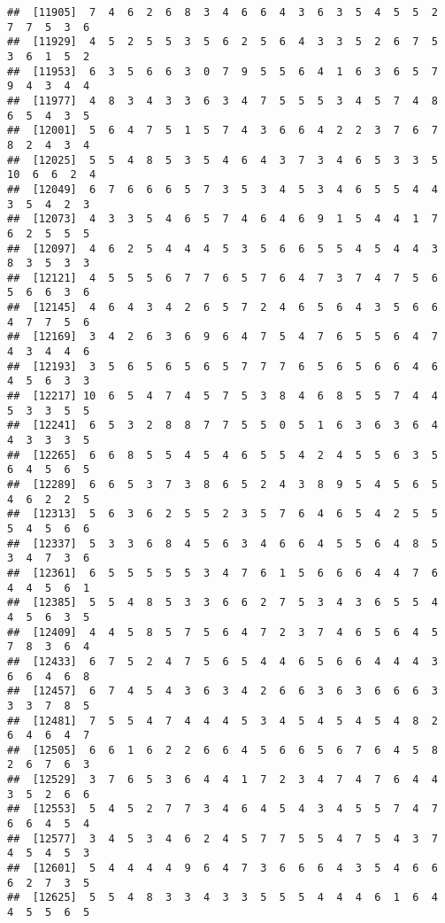 \documentclass[
]{book}
\begin{document}
\begin{verbatim}
##  [11905]  7  4  6  2  6  8  3  4  6  6  4  3  6  3  5  4  5  5  2  7  7  5  3  6
##  [11929]  4  5  2  5  5  3  5  6  2  5  6  4  3  3  5  2  6  7  5  3  6  1  5  2
##  [11953]  6  3  5  6  6  3  0  7  9  5  5  6  4  1  6  3  6  5  7  9  4  3  4  4
##  [11977]  4  8  3  4  3  3  6  3  4  7  5  5  5  3  4  5  7  4  8  6  5  4  3  5
##  [12001]  5  6  4  7  5  1  5  7  4  3  6  6  4  2  2  3  7  6  7  8  2  4  3  4
##  [12025]  5  5  4  8  5  3  5  4  6  4  3  7  3  4  6  5  3  3  5 10  6  6  2  4
##  [12049]  6  7  6  6  6  5  7  3  5  3  4  5  3  4  6  5  5  4  4  3  5  4  2  3
##  [12073]  4  3  3  5  4  6  5  7  4  6  4  6  9  1  5  4  4  1  7  6  2  5  5  5
##  [12097]  4  6  2  5  4  4  4  5  3  5  6  6  5  5  4  5  4  4  3  8  3  5  3  3
##  [12121]  4  5  5  5  6  7  7  6  5  7  6  4  7  3  7  4  7  5  6  5  6  6  3  6
##  [12145]  4  6  4  3  4  2  6  5  7  2  4  6  5  6  4  3  5  6  6  4  7  7  5  6
##  [12169]  3  4  2  6  3  6  9  6  4  7  5  4  7  6  5  5  6  4  7  4  3  4  4  6
##  [12193]  3  5  6  5  6  5  6  5  7  7  7  6  5  6  5  6  6  4  6  4  5  6  3  3
##  [12217] 10  6  5  4  7  4  5  7  5  3  8  4  6  8  5  5  7  4  4  5  3  3  5  5
##  [12241]  6  5  3  2  8  8  7  7  5  5  0  5  1  6  3  6  3  6  4  4  3  3  3  5
##  [12265]  6  6  8  5  5  4  5  4  6  5  5  4  2  4  5  5  6  3  5  6  4  5  6  5
##  [12289]  6  6  5  3  7  3  8  6  5  2  4  3  8  9  5  4  5  6  5  4  6  2  2  5
##  [12313]  5  6  3  6  2  5  5  2  3  5  7  6  4  6  5  4  2  5  5  5  4  5  6  6
##  [12337]  5  3  3  6  8  4  5  6  3  4  6  6  4  5  5  6  4  8  5  3  4  7  3  6
##  [12361]  6  5  5  5  5  5  3  4  7  6  1  5  6  6  6  4  4  7  6  4  4  5  6  1
##  [12385]  5  5  4  8  5  3  3  6  6  2  7  5  3  4  3  6  5  5  4  4  5  6  3  5
##  [12409]  4  4  5  8  5  7  5  6  4  7  2  3  7  4  6  5  6  4  5  7  8  3  6  4
##  [12433]  6  7  5  2  4  7  5  6  5  4  4  6  5  6  6  4  4  4  3  6  6  4  6  8
##  [12457]  6  7  4  5  4  3  6  3  4  2  6  6  3  6  3  6  6  6  3  3  3  7  8  5
##  [12481]  7  5  5  4  7  4  4  4  5  3  4  5  4  5  4  5  4  8  2  6  4  6  4  7
##  [12505]  6  6  1  6  2  2  6  6  4  5  6  6  5  6  7  6  4  5  8  2  6  7  6  3
##  [12529]  3  7  6  5  3  6  4  4  1  7  2  3  4  7  4  7  6  4  4  3  5  2  6  6
##  [12553]  5  4  5  2  7  7  3  4  6  4  5  4  3  4  5  5  7  4  7  6  6  4  5  4
##  [12577]  3  4  5  3  4  6  2  4  5  7  7  5  5  4  7  5  4  3  7  4  5  4  5  3
##  [12601]  5  4  4  4  4  9  6  4  7  3  6  6  6  4  3  5  4  6  6  6  2  7  3  5
##  [12625]  5  5  4  8  3  3  4  3  3  5  5  5  4  4  4  6  1  6  4  4  5  5  6  5

\end{verbatim}
\end{document}
